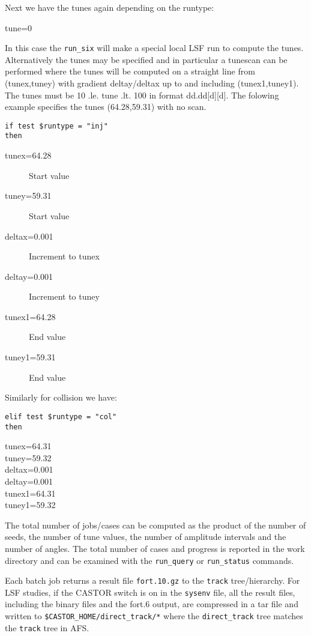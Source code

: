 \documentclass{cernatsnote}    %
\begin{document}
Next we have the tunes again depending on the runtype:
\begin{description} 
\item[tune=0]
\end{description} 
In this case the {\tt run\_six} will make a special local LSF run
to compute the tunes. Alternatively the tunes may be specified
and in particular a tunescan can be performed where 
the tunes will be computed on a straight line from
(tunex,tuney) with gradient deltay/deltax up to and including (tunex1,tuney1).
The tunes must be 10 .le. tune .lt. 100 in format dd.dd[d][d].
The folowing example specifies the tunes (64.28,59.31) with no scan. 
\begin{verbatim}
if test $runtype = "inj"
then
\end{verbatim}
\begin{description}
\item[tunex=64.28] Start value
\item[tuney=59.31] Start value
\item[deltax=0.001] Increment to tunex
\item[deltay=0.001] Increment to tuney
\item[tunex1=64.28] End value
\item[tuney1=59.31] End value
\end{description}
Similarly for collision we have:
\begin{verbatim}
elif test $runtype = "col"
then
\end{verbatim}
\begin{description}
\item[tunex=64.31]
\item[tuney=59.32]
\item[deltax=0.001]
\item[deltay=0.001]
\item[tunex1=64.31]
\item[tuney1=59.32]
\end{description}

The total number of jobs/cases can be computed as the product of the number of
seeds, the number of tune values, the number of amplitude intervals 
and the number of angles.
The total number of cases and progress is reported in the work directory and
can be examined with the {\tt run\_query} or {\tt run\_status} commands. 

Each batch job returns a result file {\tt fort.10.gz} to the {\tt track}
tree/hierarchy. For LSF studies, if the CASTOR switch is on in the {\tt sysenv} file,
all the result files, including the binary files and the fort.6 output, 
are compressed in a tar file and written to 
{\tt \$CASTOR\_HOME/direct\_track/*} where the 
{\tt direct\_track} tree matches the {\tt track} tree in AFS.
\end{document}
